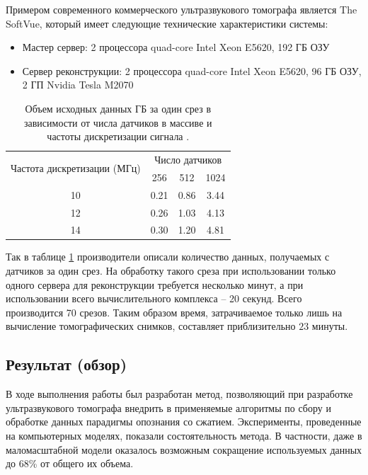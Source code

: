 \documentclass[14pt]{matmex-diploma}
\begin{document}
Примером современного коммерческого ультразвукового томографа является The SoftVue\cite{roy2013breast}, который имеет следующие технические характеристики системы:
\begin{itemize}
\item Мастер сервер: 2 процессора quad-core Intel Xeon E5620, 192 ГБ ОЗУ
\item Сервер реконструкции: 2 процессора quad-core Intel Xeon E5620, 96 ГБ ОЗУ, 2 ГП Nvidia Tesla M2070
\end{itemize}

\begin{table}[h]
\centering
\begin{tabular}{ c | c | c | c }
    \hline
    \multirow{2}{*}{Частота дискретизации (МГц)} & \multicolumn{3}{c}{Число датчиков}  \\ \cline{2-4}
    & 256 & 512 & 1024 \\

    \hline
    10 & 0.21 & 0.86 & 3.44 \\
    12 & 0.26 & 1.03 & 4.13 \\
    14 & 0.30 & 1.20 & 4.81 \\
    \hline
\end{tabular}
\caption{\small Объем исходных данных ГБ за один срез в зависимости от числа датчиков в массиве и частоты дискретизации сигнала \cite{roy2013breast}.}
\label{table:datasize_ex}
\end{table}
Так в таблице \ref{table:datasize_ex} производители описали количество данных, получаемых с датчиков за один срез. На обработку такого среза при использовании только одного сервера для реконструкции требуется несколько минут, а при использовании всего вычислительного комплекса -- 20 секунд. Всего производится 70 срезов\cite{roy2013breast}. Таким образом время, затрачиваемое только лишь на вычисление томографических снимков, составляет приблизительно $23$ минуты.

\subsection{Результат (обзор)}

В ходе выполнения работы был разработан метод, позволяющий при разработке ультразвукового томографа внедрить в применяемые алгоритмы по сбору и обработке данных парадигмы опознания со сжатием. Эксперименты, проведенные на компьютерных моделях, показали состоятельность метода. В частности, даже в маломасштабной модели оказалось возможным сокращение используемых данных до 68\% от общего их объема.
\end{document}
